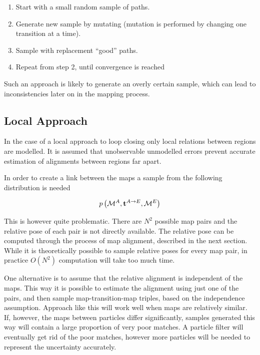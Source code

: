 \begin{enumerate}
\item Start with a small random sample of paths. 
\item Generate new sample by mutating (mutation is performed by
  changing one transition at a time).
\item Sample with replacement ``good'' paths.
\item Repeat from step 2, until convergence is reached
\end{enumerate}

Such an approach is likely to generate an overly certain sample, which
can lead to inconsistencies later on in the mapping process.




\subsection{Local Approach}

In the case of a local approach to loop closing only local relations
between regions are modelled. It is assumed that unobservable
unmodelled errors prevent accurate estimation of alignments between
regions far apart.

In order to create a link between the maps a sample from the following
distribution is needed

$$
\prob{\mapA,\tr{}{A}{E},\mapE} 
$$

This is however quite problematic. There are $N^2$ possible map pairs
and the relative pose of each pair is not directly available. The
relative pose can be computed through the process of map alignment,
described in the next section. While it is theoretically possible to
sample relative poses for every map pair, in practice $O(N^2)$
computation will take too much time.

One alternative is to assume that the relative alignment is
independent of the maps. This way it is possible to estimate the
alignment using just one of the pairs, and then sample
map-transition-map triples, based on the independence
assumption. Approach like this will work well when maps are relatively
similar. If, however, the maps between particles differ significantly,
samples generated this way will contain a large proportion of very poor
matches. A particle filter will eventually get rid of the poor matches,
however more particles will be needed to represent the uncertainty
accurately.

